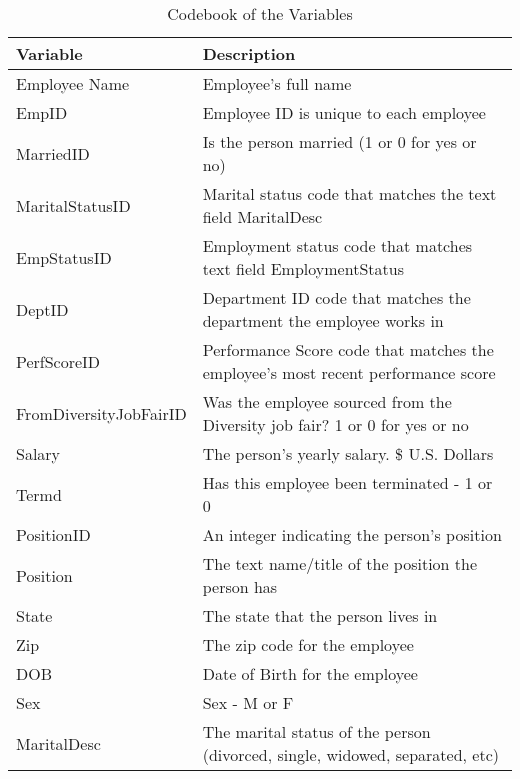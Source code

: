 \documentclass[11pt]{article}
\begin{document}
\begin{sidewaystable}[!hbtp]
	\begin{small}
		\caption{Codebook of the Variables}
		\label{tab:codebook}
		\begin{center}
			\begin{tabular}[c]{l|l}
                        \textbf{Variable}  &  \textbf{Description} \\  
                        \hline
                        Employee Name  &  Employee's full name \\ 
                        EmpID  &  Employee ID is unique to each employee\\
                        MarriedID  &  Is the person married (1 or 0 for yes or no)\\ 
                        MaritalStatusID  &  Marital status code that matches the text field MaritalDesc  \\
                        EmpStatusID  &  Employment status code that matches text field EmploymentStatus  \\
                        DeptID  &  Department ID code that matches the department the employee works in  \\
                        PerfScoreID  &  Performance Score code that matches the employee's most recent performance score  \\
                        FromDiversityJobFairID  &  Was the employee sourced from the Diversity job fair? 1 or 0 for yes or no  \\
                        Salary  &  The person's yearly salary. \$ U.S. Dollars  \\
                        Termd  &  Has this employee been terminated - 1 or 0  \\
                        PositionID  &  An integer indicating the person's position  \\
                        Position  &  The text name/title of the position the person has  \\
                        State  &  The state that the person lives in  \\
                        Zip  &  The zip code for the employee  \\
                        DOB  &  Date of Birth for the employee \\
                        Sex  &  Sex - M or F  \\
                        MaritalDesc  &  The marital status of the person (divorced, single, widowed, separated, etc)  \\

\end{tabular}
\end{center}
\end{small}
\end{sidewaystable}
\end{document}

